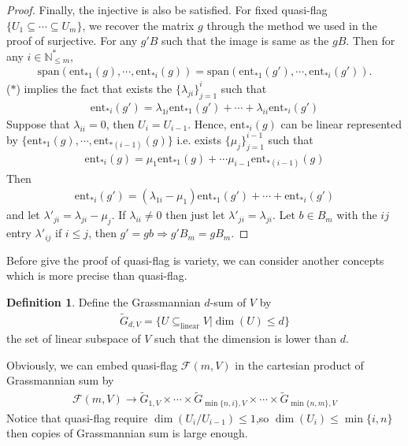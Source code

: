 \documentclass[10pt,UTF8]{article}
\theoremstyle{definition}
\newtheorem{definition}{Definition}[section]
\newtheorem*{proof}{Proof}
\begin{document}
\begin{proof}
  Finally, the injective is also be satisfied. For fixed quasi-flag $\{U_1\subseteq \cdots \subseteq U_m\}$, we recover the matrix $g$ through the method
  we used in the proof of surjective. For any $g'B$ such that the image is same as the $gB$. Then for any $i\in \mathbb{N}^*_{\le m}$,
  \begin{align}
    \text{span}\left(\text{ent}_{*1}(g),\cdots,\text{ent}_{*i}(g)\right) = \text{span}\left(\text{ent}_{*1}(g'),\cdots,\text{ent}_{*i}(g')\right). \tag{$*$}
  \end{align} 
  ($*$) implies the fact that exists the $\{\lambda_{ji}\}_{j=1}^{i}$ such that 
  \begin{align*}
    \text{ent}_{*i}(g') = \lambda_{1i} \text{ent}_{*1}(g')+\cdots+\lambda_{ii} \text{ent}_{*i}(g')
  \end{align*}
  Suppose that $\lambda_{ii}=0$, then $U_i=U_{i-1}$. Hence, $\text{ent}_{*i}(g)$ can be linear represented by $\{\text{ent}_{*1}(g),\cdots,\text{ent}_{*(i-1)}(g)\}$ i.e.
  exists $\{\mu_j\}_{j=1}^{i-1}$ such that
  \begin{align*}
    \text{ent}_{*i}(g) = \mu_1\text{ent}_{*1}(g)+\cdots \mu_{i-1}\text{ent}_{*(i-1)}(g)
  \end{align*}
  Then 
  \begin{align*}
    \text{ent}_{*i}(g') = (\lambda_{1i}-\mu_1) \text{ent}_{*1}(g')+\cdots+ \text{ent}_{*i}(g')
  \end{align*}
  and let $\lambda'_{ji} = \lambda_{ji}-\mu_j$. If $\lambda_{ii}\neq 0$ then just let $\lambda'_{ji}=\lambda_{ji}$.
  Let $b\in B_m$ with the $ij$ entry $\lambda'_{ij}$ if $i\le j$, then $g'=gb\Rightarrow g'B_m=gB_m$.

  \rightline{$\qedsymbol$}
\end{proof}

Before give the proof of quasi-flag is variety, we can consider another concepts which is more precise than quasi-flag.
\begin{definition}
  Define the Grassmannian $d$-sum of $V$ by
  \begin{align*}
    \tilde{G}_{d,V} = \{U\subseteq_{\text{linear}} V|\dim(U)\le d\}
  \end{align*} 
  the set of linear subspace of $V$ such that the dimension is lower than $d$.
\end{definition}

Obviously, we can embed quasi-flag $\mathcal{F}(m,V)$ in the cartesian product of Grassmannian sum by
\begin{align*}
  \mathcal{F}(m,V) \to \tilde{G}_{1,V} \times \cdots\times \tilde{G}_{\min\{n,i\},V}  \times \cdots \times \tilde{G}_{\min\{n,m\},V}
\end{align*}
Notice that quasi-flag require $\dim(U_{i}/U_{i-1})\le 1$,so $\dim(U_i)\le \min\{i,n\}$
then copies of Grassmannian sum is large enough.
\end{document}

